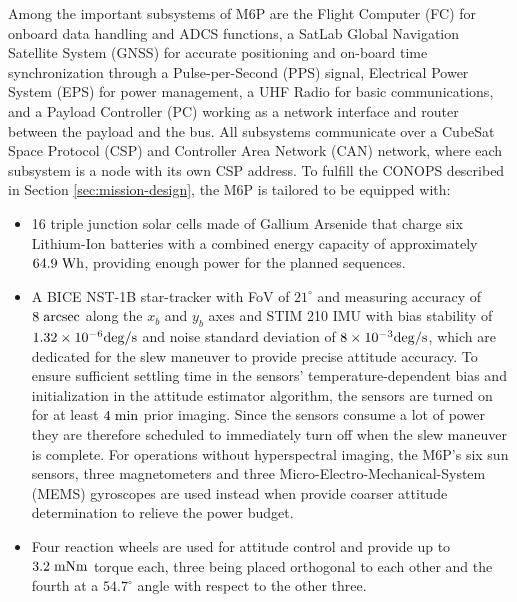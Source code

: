 Among the important subsystems of M6P are the Flight Computer (FC) for onboard data handling and ADCS functions, a SatLab Global Navigation Satellite System (GNSS) for accurate positioning and on-board time synchronization through a Pulse-per-Second (PPS) signal, Electrical Power System (EPS) for power management, a UHF Radio for basic communications, and a Payload Controller (PC) working as a network interface and router between the payload and the bus. All subsystems communicate over a CubeSat Space Protocol (CSP) and Controller Area Network (CAN) network, where each subsystem is a node with its own CSP address. To fulfill the CONOPS described in Section \ref{sec:mission-design}, the M6P is tailored to be equipped with: 
\begin{itemize}
    \item 16 triple junction solar cells made of Gallium Arsenide that charge six Lithium-Ion batteries with a combined energy capacity of approximately $64.9 \hspace{3pt} \rm{Wh}$, providing enough power for the planned sequences.
    \item A BICE NST-1B star-tracker with FoV of $21^{\circ}$ and measuring accuracy of $8 \hspace{3pt} \rm{arcsec}$ along the $x_b$ and $y_b$ axes and STIM 210 IMU with bias stability of $1.32\times 10^{-6}\rm{deg/s}$ and noise standard deviation of $8\times 10^{-3} \rm{deg/s}$, which are dedicated for the slew maneuver to provide precise attitude accuracy. To ensure sufficient settling time in the sensors' temperature-dependent bias and initialization in the attitude estimator algorithm, the sensors are turned on for at least $4 \hspace{3pt} \rm{min}$ prior imaging. Since the sensors consume a lot of power they are therefore scheduled to immediately turn off when the slew maneuver is complete. For operations without hyperspectral imaging, the M6P's six sun sensors, three magnetometers and three Micro-Electro-Mechanical-System (MEMS) gyroscopes are used instead when provide coarser attitude determination to relieve the power budget. 
    \item Four reaction wheels are used for attitude control and provide up to $3.2 \hspace{3pt} \rm{mNm}$ torque each, three being placed orthogonal to each other and the fourth at a $54.7^{\circ}$ angle with respect to the other three. 

\end{itemize}
